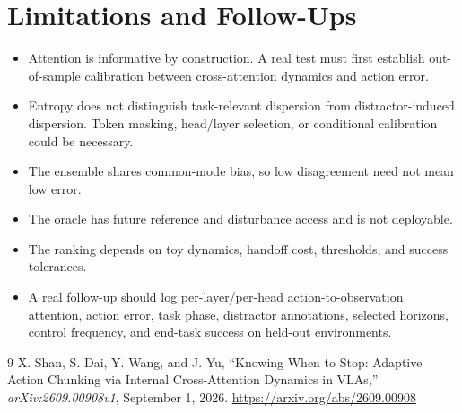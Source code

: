 \documentclass[11pt]{article}
\begin{document}
\section{Limitations and Follow-Ups}
\begin{itemize}[leftmargin=1.5em]
  \item Attention is informative by construction. A real test must first establish out-of-sample calibration between cross-attention dynamics and action error.
  \item Entropy does not distinguish task-relevant dispersion from distractor-induced dispersion. Token masking, head/layer selection, or conditional calibration could be necessary.
  \item The ensemble shares common-mode bias, so low disagreement need not mean low error.
  \item The oracle has future reference and disturbance access and is not deployable.
  \item The ranking depends on toy dynamics, handoff cost, thresholds, and success tolerances.
  \item A real follow-up should log per-layer/per-head action-to-observation attention, action error, task phase, distractor annotations, selected horizons, control frequency, and end-task success on held-out environments.
\end{itemize}

\begin{thebibliography}{9}
X. Shan, S. Dai, Y. Wang, and J. Yu,
``Knowing When to Stop: Adaptive Action Chunking via Internal Cross-Attention Dynamics in VLAs,''
\emph{arXiv:2609.00908v1}, September 1, 2026.
\url{https://arxiv.org/abs/2609.00908}
\end{thebibliography}
\end{document}
